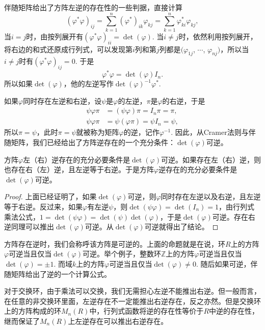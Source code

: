 伴随矩阵给出了方阵左逆的存在性的一些判据，直接计算
\[
	(\varphi^*\varphi)_{ij}=\sum_{k=1}^n(\varphi^*)_{ik}\varphi_{kj}=\sum_{k=1}^n\varphi^*_{ki}\varphi_{kj},
\]
当$i=j$时，由按列展开有$(\varphi^*\varphi)_{ii}=\det(\varphi)$. 当$i\neq j$时，依然利用按列展开，将右边的和式还原成行列式，可以发现第$i$列和第$j$列都是$(\varphi_{1j}$, $\cdots$, $\varphi_{nj})$，所以当$i\neq j$时有$(\varphi^*\varphi)_{ij}=0$. 于是
\[
	\varphi^*\varphi=\det(\varphi)I_n.
\]
所以如果$\det(\varphi)$，他的左逆写作$\det(\varphi)^{-1}\varphi^*$.

\para 如果$\varphi$同时存在左逆和右逆，设$\psi$是$\varphi$的左逆，$\pi$是$\varphi$的右逆，于是
\[
\begin{aligned}
	\psi\varphi\pi&=(\psi\varphi)\pi=I_n \pi=\pi,\\
	\psi\varphi\pi&=\psi(\varphi\pi)=\psi I_n=\psi,
\end{aligned}
\]
所以$\pi=\psi$，此时$\pi=\psi$就被称为矩阵$\varphi$的逆，记作$\varphi^{-1}$. 因此，从Cramer法则与伴随矩阵，我们已经给出了方阵逆存在的一个充分条件：$\det(\varphi)$可逆。

\begin{pro}
方阵$\varphi$左（右）逆存在的充分必要条件是$\det(\varphi)$可逆。如果存在左（右）逆，则也存在右（左）逆，且左逆等于右逆。于是方阵$\varphi$逆存在的充分必要条件是$\det(\varphi)$可逆。
\end{pro}

\begin{proof}
上面已经证明了，如果$\det(\varphi)$可逆，则$\varphi$同时存在左逆以及右逆，且左逆等于右逆。反过来，如果$\varphi$有左逆$\psi$，则$\det(\psi\varphi)=\det(I_n)=1$，由行列式乘法公式，$1=\det(\psi\varphi)=\det(\psi)\det(\varphi)$，于是$\det(\varphi)$可逆。存在右逆同理可以推出$\det(\varphi)$可逆。从$\det(\varphi)$可逆就得出了结论。
\end{proof}

方阵存在逆时，我们会称呼该方阵是可逆的。上面的命题就是在说，环$R$上的方阵$\varphi$可逆当且仅当$\det(\varphi)$可逆。举个例子，整数环$\mathbb{Z}$上的方阵$\varphi$可逆当且仅当$\det(\varphi)=\pm 1$. 而域$k$上的方阵$\varphi$可逆当且仅当$\det(\varphi)\neq 0$. 随后如果可逆，伴随矩阵给出了逆的一个计算公式。

对于交换环，由于乘法可以交换，我们无需担心左逆不能推出右逆。但一般而言，在任意的非交换环里面，左逆存在不一定能推出右逆存在，反之亦然。但是交换环上的方阵构成的环$M_n(R)$中，行列式函数将逆的存在性等价于$R$中逆的存在性，继而保证了$M_n(R)$上左逆存在可以推出右逆存在。
